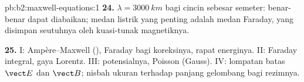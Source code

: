 \begin{solution}{pb:b2:maxwell-equations:1}
\textbf{24.} $\lambda = \qty{3000}{km}$ bagi cincin sebesar semeter:  benar-benar dapat diabaikan; medan listrik yang penting adalah
medan Faraday, yang disimpan seutuhnya oleh kuasi-tunak magnetiknya.

\textbf{25.} I: Ampère--Maxwell (), Faraday bagi
koreksinya, rapat energinya. II: Faraday integral, gaya Lorentz.
III: potensialnya, Poisson (Gauss). IV: lompatan batas $\vect E$
dan $\vect B$; nisbah ukuran terhadap panjang gelombang bagi rezimnya.
\end{solution}
